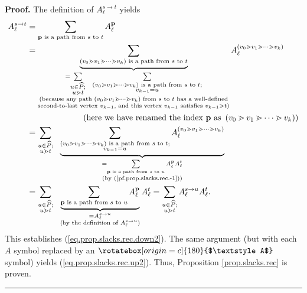\documentclass[numbers=enddot,12pt,final,onecolumn,notitlepage]{scrartcl}%
\theoremstyle{definition}
\newenvironment{verlong}{}{}
\newcommand{\upslack}{\mathchoice{\rotatebox[origin=c]{180}{$\displaystyle A$}}{\rotatebox[origin=c]{180}{$\textstyle A$}}{\rotatebox[origin=c]{180}{$\scriptstyle A$}}{\rotatebox[origin=c]{180}{$\scriptscriptstyle A$}}}
\newcommand{\downslack}{A}
\newenvironment{proof}[1][Proof]{\noindent\textbf{#1.} }{\ \rule{0.5em}{0.5em}}
\let\sumnonlimits\sum
\renewcommand{\sum}{\sumnonlimits\limits}
\begin{document}
\begin{verlong}
\begin{proof}
The definition of $\downslack_{\ell}^{s\rightarrow t}$ yields%
\begin{align*}
\downslack_{\ell}^{s\rightarrow t}  &  =\sum_{\mathbf{p}\text{ is a path from
}s\text{ to }t}\downslack_{\ell}^{\mathbf{p}}\\
&  =\underbrace{\sum_{\left(  v_{0}\gtrdot v_{1}\gtrdot\cdots\gtrdot
v_{k}\right)  \text{ is a path from }s\text{ to }t}}_{\substack{=\sum
_{\substack{u\in\widehat{P};\\u\gtrdot t}}\ \ \sum_{\substack{\left(
v_{0}\gtrdot v_{1}\gtrdot\cdots\gtrdot v_{k}\right)  \text{ is a path from
}s\text{ to }t;\\v_{k-1}=u}}\\\text{(because any path }\left(  v_{0}\gtrdot
v_{1}\gtrdot\cdots\gtrdot v_{k}\right)  \text{ from }s\text{ to }t\text{ has a
well-defined}\\\text{second-to-last vertex }v_{k-1}\text{, and this vertex
}v_{k-1}\text{ satisfies }v_{k-1}\gtrdot t\text{)}}}\downslack_{\ell}^{\left(
v_{0}\gtrdot v_{1}\gtrdot\cdots\gtrdot v_{k}\right)  }\\
&  \ \ \ \ \ \ \ \ \ \ \ \ \ \ \ \ \ \ \ \ \left(  \text{here we have renamed
the index }\mathbf{p}\text{ as }\left(  v_{0}\gtrdot v_{1}\gtrdot\cdots\gtrdot
v_{k}\right)  \right) \\
&  =\sum_{\substack{u\in\widehat{P};\\u\gtrdot t}}\ \ \underbrace{\sum
_{\substack{\left(  v_{0}\gtrdot v_{1}\gtrdot\cdots\gtrdot v_{k}\right)
\text{ is a path from }s\text{ to }t;\\v_{k-1}=u}}\downslack_{\ell}^{\left(
v_{0}\gtrdot v_{1}\gtrdot\cdots\gtrdot v_{k}\right)  }}_{\substack{=\sum
_{\mathbf{p}\text{ is a path from }s\text{ to }u}\downslack_{\ell}%
^{\mathbf{p}}\downslack_{\ell}^{t}\\\text{(by (\ref{pf.prop.slacks.rec.-1}))}%
}}\\
&  =\sum_{\substack{u\in\widehat{P};\\u\gtrdot t}}\ \ \underbrace{\sum
_{\mathbf{p}\text{ is a path from }s\text{ to }u}\downslack_{\ell}%
^{\mathbf{p}}}_{\substack{=\downslack_{\ell}^{s\rightarrow u}\\\text{(by the
definition of }\downslack_{\ell}^{s\rightarrow u}\text{)}}}\downslack_{\ell
}^{t}=\sum_{\substack{u\in\widehat{P};\\u\gtrdot t}}\downslack_{\ell
}^{s\rightarrow u}\downslack_{\ell}^{t}.
\end{align*}
This establishes (\ref{eq.prop.slacks.rec.down2}). The same argument (but with
each $\downslack$ symbol replaced by an $\upslack$ symbol) yields
(\ref{eq.prop.slacks.rec.up2}). Thus, Proposition \ref{prop.slacks.rec} is proven.
\end{proof}
\end{verlong}
\end{document}
